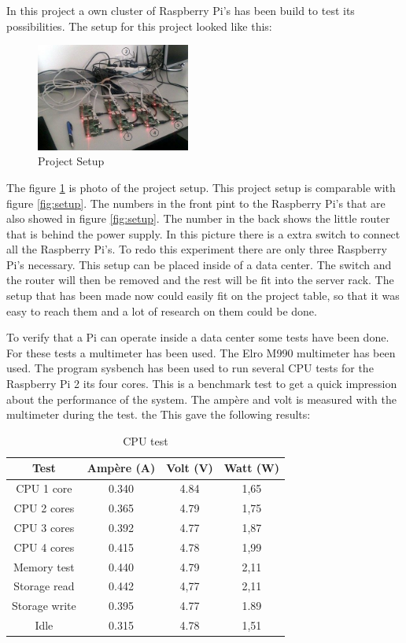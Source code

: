 \documentclass{sig-alternate-br}
\begin{document}
In this project a own cluster of Raspberry Pi's has been build to test its possibilities. The setup for this project looked like this:
\begin{figure}[H]
	\centering 
	\includegraphics[width=0.45\textwidth]{setup.jpg}
	\caption{Project Setup}
	\label{fig:projectsetup} %
\end{figure}
The figure \ref{fig:projectsetup} is photo of the project setup. This project setup is comparable with figure \ref{fig:setup}. The numbers in the front pint to the Raspberry Pi's that are also showed in figure \ref{fig:setup}. The number in the back shows the little router that is behind the power supply. In this picture there is a extra switch to connect all the Raspberry Pi's. To redo this experiment there are only three Raspberry Pi's necessary. \newline 
This setup can be placed inside of a data center. The switch and the router will then be removed and the rest will be fit into the server rack. The setup that has been made now could easily fit on the project table, so that it was easy to reach them and a lot of research on them could be done. 

To verify that a Pi can operate inside a data center some tests have been done. For these tests a multimeter has been used. The Elro M990 multimeter has been used. The program sysbench has been used to run several CPU tests for the Raspberry Pi 2 its four cores. This is a benchmark test to get a quick impression about the performance of the system. The ampère and volt is measured with the multimeter during the test. the This gave the following results:
\begin{table}[H]
	\centering \caption{CPU test}
	\begin{tabular}{|c|c|c|c|} \hline
		Test & Ampère (A) & Volt (V) & Watt (W)\\ \hline
		CPU 1 core & 0.340 & 4.84  & 1,65\\ \hline
		CPU 2 cores & 0.365 & 4.79 & 1,75\\ \hline
		CPU 3 cores & 0.392 & 4.77 & 1,87 \\ \hline
		CPU 4 cores & 0.415 & 4.78 & 1,99 \\ \hline
		Memory test & 0.440 & 4.79 & 2,11 \\ \hline
		Storage read & 0.442 & 4,77 & 2,11\\ \hline
		Storage write & 0.395 & 4.77 & 1.89 \\ \hline
		Idle & 0.315 & 4.78 & 1,51 \\ \hline
	\end{tabular}
	\label{tab:cpu}
\end{table}
\end{document}
